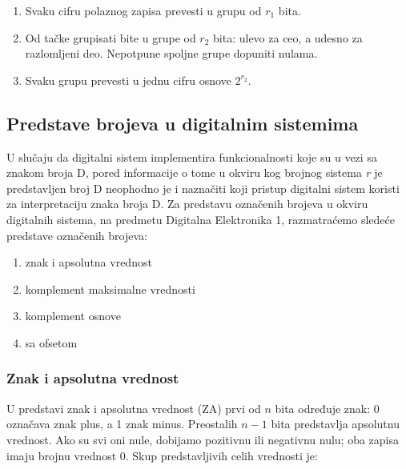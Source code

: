 \documentclass[a4paper,11pt]{article}
\numberwithin{equation}{section}
\begin{document}
\begin{enumerate}[label=\arabic*),leftmargin=*]
\item Svaku cifru polaznog zapisa prevesti u grupu od $r_1$ bita.
\item Od tačke grupisati bite u grupe od $r_2$ bita: ulevo za ceo, a udesno za razlomljeni deo. Nepotpune spoljne grupe dopuniti nulama.
\item Svaku grupu prevesti u jednu cifru osnove $2^{r_2}$.
\end{enumerate}

\FloatBarrier
\subsection{Predstave brojeva u digitalnim sistemima}\label{sec:1.2}


U slučaju da digitalni sistem implementira funkcionalnosti koje su u vezi sa znakom broja D, pored informacije o tome u okviru kog brojnog sistema \emph{r} je predstavljen broj D neophodno je i naznačiti koji pristup digitalni sistem koristi za interpretaciju znaka broja D. Za predstavu označenih brojeva u okviru digitalnih sistema, na predmetu Digitalna Elektronika 1, razmatraćemo sledeće predstave označenih brojeva:



\begin{enumerate}[label=\arabic*),start=1,leftmargin=*]
\item znak i apsolutna vrednost

\item komplement maksimalne vrednosti

\item komplement osnove

\item sa ofsetom

\end{enumerate}


\subsubsection{Znak i apsolutna vrednost}\label{sec:1.2.1}


U predstavi znak i apsolutna vrednost (ZA) prvi od $n$ bita određuje znak: 0 označava znak plus, a 1 znak minus. Preostalih $n-1$ bita predstavlja apsolutnu vrednost. Ako su svi oni nule, dobijamo pozitivnu ili negativnu nulu; oba zapisa imaju brojnu vrednost 0. Skup predstavljivih celih vrednosti je:
\end{document}
